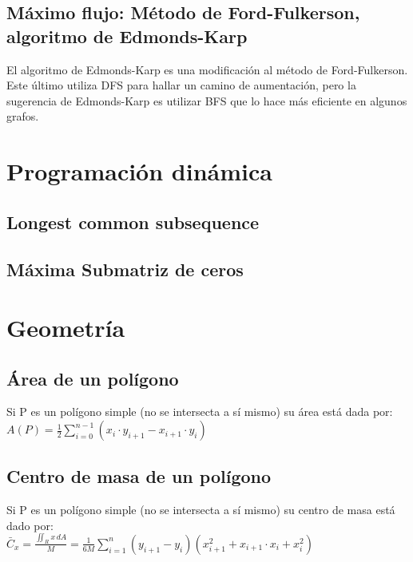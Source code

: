 \documentclass[10pt,letterpaper]{article}
\begin{document}
\subsection{Máximo flujo: Método de Ford-Fulkerson, algoritmo de Edmonds-Karp}
\medskip
El algoritmo de Edmonds-Karp es una modificación al método de Ford-Fulkerson. Este último
utiliza DFS para hallar un camino de aumentación, pero la sugerencia de Edmonds-Karp
es utilizar BFS que lo hace más eficiente en algunos grafos.

\section{Programación dinámica}
\subsection{Longest common subsequence}

\subsection{M\'axima Submatriz de ceros}

\section{Geometría}
\subsection{Área de un polígono}
Si P es un polígono simple (no se intersecta a sí mismo) su área está dada por: \\

$ A(P) = \frac{1}{2} \displaystyle\sum_{i=0}^{n-1} (x_{i} \cdot y_{i+1} - x_{i+1} \cdot y_{i}) $ \\
\bigskip

\subsection{Centro de masa de un polígono}
Si P es un polígono simple (no se intersecta a sí mismo) su centro de masa está dado por: \\

$ \displaystyle\bar{C}_{x} = \frac{ \displaystyle\iint_{R} x \, dA }{M} = \frac{1}{6M}\sum_{i=1}^{n} (y_{i+1} - y_{i}) (x_{i+1}^2 + x_{i+1} \cdot x_{i} + x_{i}^2) $
\end{document}
